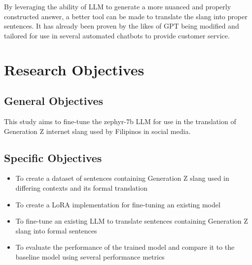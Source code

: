 By leveraging the ability of LLM to generate a more nuanced and properly constructed answer, a better tool can be made to translate the slang into proper sentences.
It has already been proven by the likes of GPT being modified and tailored for use in several automated chatbots to provide customer service.

\section{Research Objectives}
\label{sec:research_objectives}

\subsection{General Objectives}
\label{sec:general_objectives}
This study aims to fine-tune the zephyr-7b LLM for use in the translation of Generation Z internet slang used by Filipinos in social media.
\subsection{Specific Objectives}
\label{sec:specific_objectives}
\begin{itemize}
	\item To create a dataset of sentences containing Generation Z slang used in differing contexts and its formal translation
	\item To create a LoRA implementation for fine-tuning an existing model
	\item To fine-tune an existing LLM to translate sentences containing Generation Z slang into formal sentences
	\item To evaluate the performance of the trained model and compare it to the baseline model using several performance metrics
\end{itemize}

